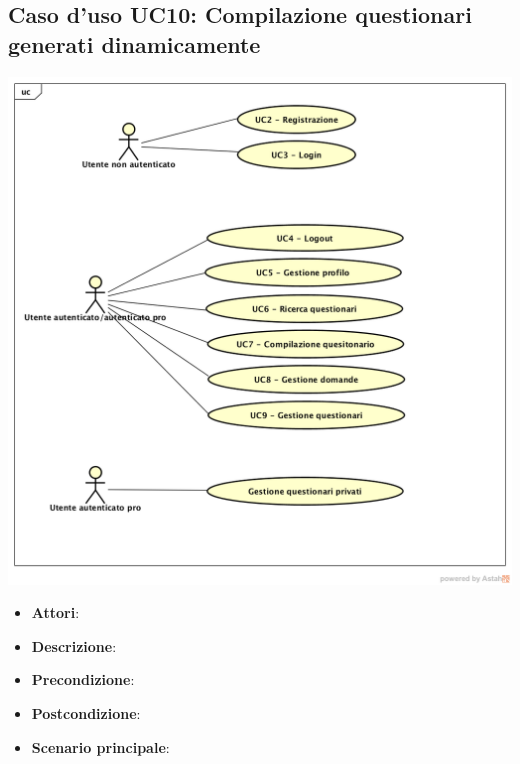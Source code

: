 \subsection{Caso d'uso UC10: Compilazione questionari generati dinamicamente}
\begin{center}
\includegraphics[scale=0.5]{UML/UC1.png}
\end{center}
\begin{itemize}
\item\textbf{Attori}: 
\item\textbf{Descrizione}: 
\item\textbf{Precondizione}: 
\item\textbf{Postcondizione}:
\item\textbf{Scenario principale}:
\end{itemize}